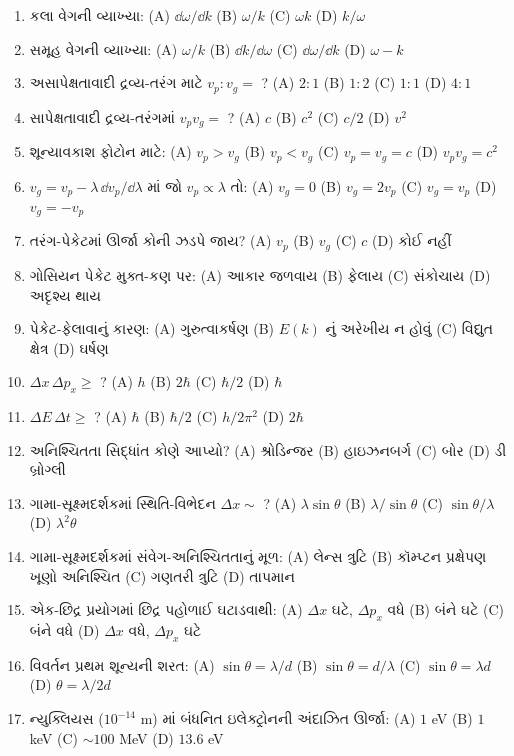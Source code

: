 \begin{enumerate}[label=\textbf{\arabic*.}]
  \item કલા વેગની વ્યાખ્યા: (A) $\dd\omega/\dd k$ (B) $\omega/k$ (C) $\omega k$ (D) $k/\omega$
  \item સમૂહ વેગની વ્યાખ્યા: (A) $\omega/k$ (B) $\dd k/\dd\omega$ (C) $\dd\omega/\dd k$ (D) $\omega-k$
  \item અસાપેક્ષતાવાદી દ્રવ્ય-તરંગ માટે $v_p:v_g=$ ? (A) $2{:}1$ (B) $1{:}2$ (C) $1{:}1$ (D) $4{:}1$
  \item સાપેક્ષતાવાદી દ્રવ્ય-તરંગમાં $v_p v_g=$ ? (A) $c$ (B) $c^{2}$ (C) $c/2$ (D) $v^{2}$
  \item શૂન્યાવકાશ ફોટોન માટે: (A) $v_p>v_g$ (B) $v_p<v_g$ (C) $v_p=v_g=c$ (D) $v_pv_g=c^2$
  \item $v_g=v_p-\lambda\,\dd v_p/\dd\lambda$ માં જો $v_p\propto\lambda$ તો: (A) $v_g=0$ (B) $v_g=2v_p$ (C) $v_g=v_p$ (D) $v_g=-v_p$
  \item તરંગ-પેકેટમાં ઊર્જા કોની ઝડપે જાય? (A) $v_p$ (B) $v_g$ (C) $c$ (D) કોઈ નહીં
  \item ગોસિયન પેકેટ મુક્ત-કણ પર: (A) આકાર જળવાય (B) ફેલાય (C) સંકોચાય (D) અદૃશ્ય થાય
  \item પેકેટ-ફેલાવાનું કારણ: (A) ગુરુત્વાકર્ષણ (B) $E(k)$ નું અરેખીય ન હોવું (C) વિદ્યુત ક્ષેત્ર (D) ઘર્ષણ
  \item $\Delta x\,\Delta p_x\ge$ ? (A) $h$ (B) $2\hbar$ (C) $\hbar/2$ (D) $\hbar$
  \item $\Delta E\,\Delta t\ge$ ? (A) $\hbar$ (B) $\hbar/2$ (C) $h/2\pi^2$ (D) $2\hbar$
  \item અનિશ્ચિતતા સિદ્ધાંત કોણે આપ્યો? (A) શ્રોડિન્જર (B) હાઇઝનબર્ગ (C) બોર (D) ડી બ્રોગ્લી
  \item ગામા-સૂક્ષ્મદર્શકમાં સ્થિતિ-વિભેદન $\Delta x\sim$ ? (A) $\lambda\sin\theta$ (B) $\lambda/\sin\theta$ (C) $\sin\theta/\lambda$ (D) $\lambda^2\theta$
  \item ગામા-સૂક્ષ્મદર્શકમાં સંવેગ-અનિશ્ચિતતાનું મૂળ: (A) લેન્સ ત્રુટિ (B) કૉમ્પ્ટન પ્રક્ષેપણ ખૂણો અનિશ્ચિત (C) ગણતરી ત્રુટિ (D) તાપમાન
  \item એક-છિદ્ર પ્રયોગમાં છિદ્ર પહોળાઈ ઘટાડવાથી: (A) $\Delta x$ ઘટે, $\Delta p_x$ વધે (B) બંને ઘટે (C) બંને વધે (D) $\Delta x$ વધે, $\Delta p_x$ ઘટે
  \item વિવર્તન પ્રથમ શૂન્યની શરત: (A) $\sin\theta=\lambda/d$ (B) $\sin\theta=d/\lambda$ (C) $\sin\theta=\lambda d$ (D) $\theta=\lambda/2d$
  \item ન્યુક્લિયસ ($10^{-14}$ m) માં બંધનિત ઇલેક્ટ્રોનની અંદાઝિત ઊર્જા: (A) $1$ eV (B) $1$ keV (C) $\sim100$ MeV (D) $13.6$ eV

\end{enumerate}
